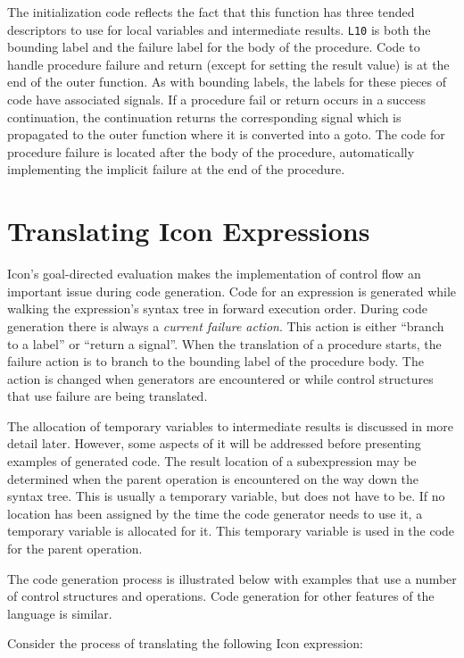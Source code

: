 \noindent
The initialization code reflects the fact that this function has three
tended descriptors to use for local variables and intermediate
results. \texttt{L10} is both the bounding label and the failure label for the
body of the procedure. Code to handle procedure failure and return
(except for setting the result value) is at the end of the outer
function. As with bounding labels, the labels for these pieces of code
have associated signals. If a procedure fail or return occurs in a
success continuation, the continuation returns the corresponding
signal which is propagated to the outer function where it is converted
into a goto. The code for procedure failure is located after the body
of the procedure, automatically implementing the implicit failure at
the end of the procedure.


\section{Translating Icon Expressions}

Icon's goal-directed evaluation makes the implementation of control
flow an important issue during code generation. Code for an expression
is generated while walking the expression's syntax tree in forward
execution order. During code generation there is always a
\textit{current failure action}. This action is either ``branch to a
label'' or ``return a signal''.  When the translation of a procedure
starts, the failure action is to branch to the bounding label of the
procedure body. The action is changed when generators are encountered
or while control structures that use failure are being translated.

The allocation of temporary variables to intermediate results is
discussed in more detail later. However, some aspects of it will be
addressed before presenting examples of generated code. The result
location of a subexpression may be determined when the parent
operation is encountered on the way down the syntax tree. This is
usually a temporary variable, but does not have to be. If no location
has been assigned by the time the code generator needs to use it, a
temporary variable is allocated for it. This temporary variable is
used in the code for the parent operation.

The code generation process is illustrated below with examples that
use a number of control structures and operations.  Code generation
for other features of the language is similar.

Consider the process of translating the following Icon expression: 

